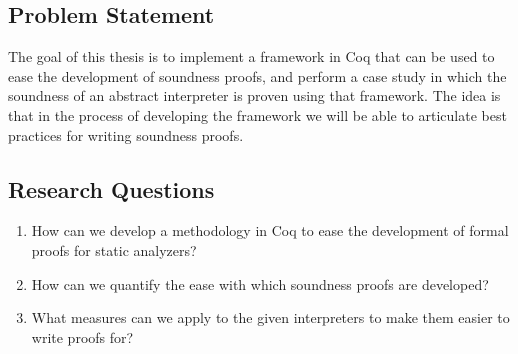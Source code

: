 \subsection{Problem Statement}
The goal of this thesis is to implement a framework in Coq that can be used to 
ease the development of soundness
proofs, and perform a case study in which the soundness of an abstract
interpreter is proven using that framework. The idea is that in the process of
developing the framework we will be able to articulate best practices for
writing soundness proofs.

\subsection{Research Questions}

\begin{center}
	\begin{enumerate}
		\item
How can we develop a methodology in Coq to ease the development of
formal proofs for static analyzers?

		\item
	How can we quantify the ease with which soundness proofs are developed?

		\item
	What measures can we apply to the given interpreters to make them easier to
	write proofs for?
	\end{enumerate}
\end{center}
